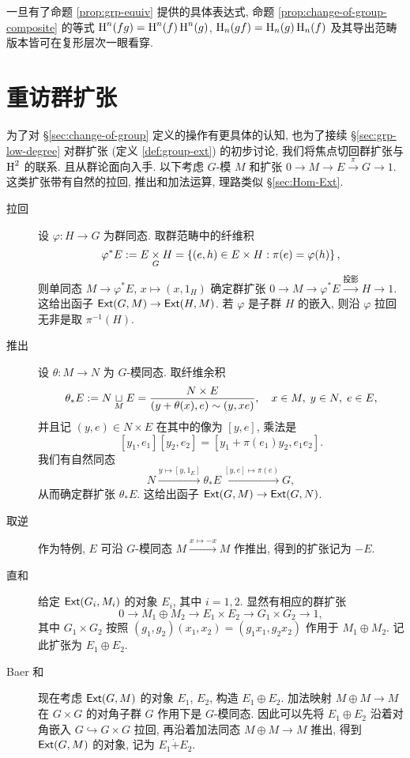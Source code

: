 一旦有了命题 \ref{prop:grp-equiv} 提供的具体表达式, 命题 \ref{prop:change-of-group-composite} 的等式 $\operatorname{H}^n(fg) = \operatorname{H}^n(f) \operatorname{H}^n(g)$, $\operatorname{H}_n(gf) = \operatorname{H}_n(g) \operatorname{H}_n(f)$ 及其导出范畴版本皆可在复形层次一眼看穿.

\section{重访群扩张}\label{sec:group-ext-revisited}
为了对 \S\ref{sec:change-of-group} 定义的操作有更具体的认知, 也为了接续 \S\ref{sec:grp-low-degree} 对群扩张 (定义 \ref{def:group-ext}) 的初步讨论, 我们将焦点切回群扩张与 $\operatorname{H}^2$ 的联系. 且从群论面向入手. 以下考虑 $G$-模 $M$ 和扩张 $0 \to M \to E \xrightarrow{\pi} G \to 1$. 这类扩张带有自然的拉回, 推出和加法运算, 理路类似 \S\ref{sec:Hom-Ext}.

\begin{description}
	\item[拉回] 设 $\varphi: H \to G$ 为群同态. 取群范畴中的纤维积
	\[ \varphi^* E := E \underset{G}{\times} H = \left\{ (e, h) \in E \times H: \pi(e) = \varphi(h) \right\}, \]
	则单同态 $M \to \varphi^* E$, $x \mapsto (x, 1_H)$ 确定群扩张 $0 \to M \to \varphi^* E \xrightarrow{\text{投影}} H \to 1$. 这给出函子 $\mathsf{Ext}(G, M) \to \mathsf{Ext}(H, M)$. 若 $\varphi$ 是子群 $H$ 的嵌入, 则沿 $\varphi$ 拉回无非是取 $\pi^{-1}(H)$.
	
	\item[推出] 设 $\theta: M \to N$ 为 $G$-模同态. 取纤维余积
	\[ \theta_* E := N \underset{M}{\sqcup} E = \frac{N \times E}{(y + \theta(x), e) \sim (y, xe)}, \quad x \in M, \; y \in N, \; e \in E, \]
	并且记 $(y, e) \in N \times E$ 在其中的像为 $[y, e]$, 乘法是
	\[ [y_1, e_1] [y_2, e_2] = [y_1 + \pi(e_1) y_2, e_1 e_2]. \]
	我们有自然同态
	\[ N \xrightarrow{y \mapsto [y, 1_E]} \theta_* E \xrightarrow{[y, e] \mapsto \pi(e)} G, \]
	从而确定群扩张 $\theta_* E$. 这给出函子 $\mathsf{Ext}(G, M) \to \mathsf{Ext}(G, N)$.
	
	\item[取逆] 作为特例, $E$ 可沿 $G$-模同态 $M \xrightarrow{x \mapsto -x} M$ 作推出, 得到的扩张记为 $-E$.
	
	\item[直和] 给定 $\mathsf{Ext}(G_i, M_i)$ 的对象 $E_i$, 其中 $i = 1, 2$. 显然有相应的群扩张
	\[ 0 \to M_1 \oplus M_2 \to E_1 \times E_2 \to G_1 \times G_2 \to 1, \]
	其中 $G_1 \times G_2$ 按照 $(g_1, g_2)(x_1, x_2) = (g_1 x_1, g_2 x_2)$ 作用于 $M_1 \oplus M_2$. 记此扩张为 $E_1 \oplus E_2$.
	
	\item[Baer 和] 现在考虑 $\mathsf{Ext}(G, M)$ 的对象 $E_1$, $E_2$, 构造 $E_1 \oplus E_2$. 加法映射 $M \oplus M \to M$ 在 $G \times G$ 的对角子群 $G$ 作用下是 $G$-模同态. 因此可以先将 $E_1 \oplus E_2$ 沿着对角嵌入 $G \hookrightarrow G \times G$ 拉回, 再沿着加法同态 $M \oplus M \to M$ 推出, 得到 $\mathsf{Ext}(G, M)$ 的对象, 记为 $E_1 \dot{+} E_2$.
\end{description}

